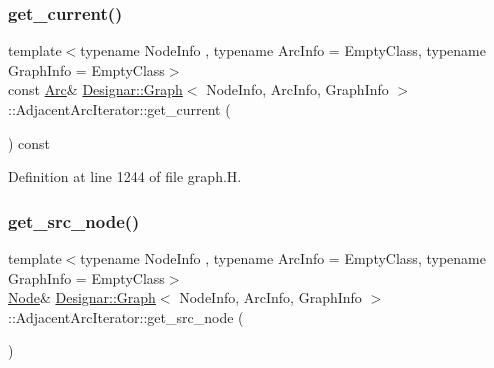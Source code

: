\subsubsection{\texorpdfstring{get\+\_\+current()}{get\_current()}\hspace{0.1cm}{\footnotesize\ttfamily [2/2]}}
{\footnotesize\ttfamily template$<$typename Node\+Info , typename Arc\+Info  = Empty\+Class, typename Graph\+Info  = Empty\+Class$>$ \\
const \hyperlink{class_designar_1_1_graph_a74c730ef4ce2d20f998d72bd25c2b5bf}{Arc}\& \hyperlink{class_designar_1_1_graph}{Designar\+::\+Graph}$<$ Node\+Info, Arc\+Info, Graph\+Info $>$\+::Adjacent\+Arc\+Iterator\+::get\+\_\+current (\begin{DoxyParamCaption}{ }\end{DoxyParamCaption}) const\hspace{0.3cm}{\ttfamily [inline]}}



Definition at line 1244 of file graph.\+H.

\mbox{\label{class_designar_1_1_graph_1_1_adjacent_arc_iterator_a0a5f3238f6abde756b4498a31558a255}} 
\subsubsection{\texorpdfstring{get\+\_\+src\+\_\+node()}{get\_src\_node()}\hspace{0.1cm}{\footnotesize\ttfamily [1/2]}}
{\footnotesize\ttfamily template$<$typename Node\+Info , typename Arc\+Info  = Empty\+Class, typename Graph\+Info  = Empty\+Class$>$ \\
\hyperlink{class_designar_1_1_graph_a5dfc7dba9d092ac489c72e40390c37d0}{Node}\& \hyperlink{class_designar_1_1_graph}{Designar\+::\+Graph}$<$ Node\+Info, Arc\+Info, Graph\+Info $>$\+::Adjacent\+Arc\+Iterator\+::get\+\_\+src\+\_\+node (\begin{DoxyParamCaption}{ }\end{DoxyParamCaption})\hspace{0.3cm}{\ttfamily [inline]}}



